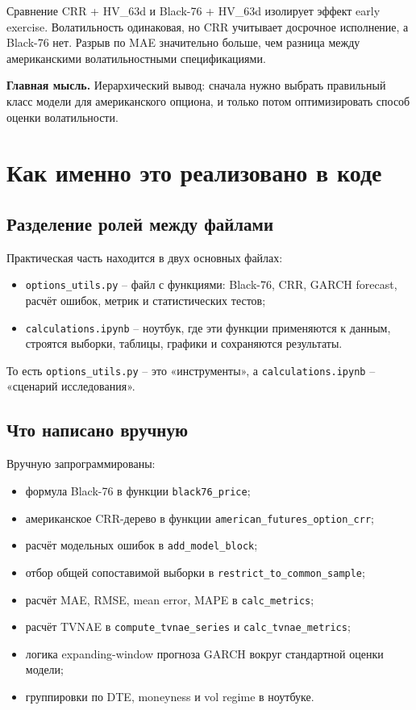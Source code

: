 \documentclass[11pt,a4paper]{article}
\newcommand{\key}[1]{%
  \vspace{0.15em}
  \noindent\colorbox{softblue}{%
    \parbox{\dimexpr\linewidth-2\fboxsep\relax}{\textbf{Главная мысль.} #1}%
  }\vspace{0.2em}
}
\begin{document}
Сравнение CRR + HV\_63d и Black-76 + HV\_63d изолирует эффект early exercise. Волатильность одинаковая, но CRR учитывает досрочное исполнение, а Black-76 нет. Разрыв по MAE значительно больше, чем разница между американскими волатильностными спецификациями.

\key{Иерархический вывод: сначала нужно выбрать правильный класс модели для американского опциона, и только потом оптимизировать способ оценки волатильности.}

\section{Как именно это реализовано в коде}

\subsection{Разделение ролей между файлами}

Практическая часть находится в двух основных файлах:

\begin{itemize}
    \item \texttt{options\_utils.py} -- файл с функциями: Black-76, CRR, GARCH forecast, расчёт ошибок, метрик и статистических тестов;
    \item \texttt{calculations.ipynb} -- ноутбук, где эти функции применяются к данным, строятся выборки, таблицы, графики и сохраняются результаты.
\end{itemize}

То есть \texttt{options\_utils.py} -- это «инструменты», а \texttt{calculations.ipynb} -- «сценарий исследования».

\subsection{Что написано вручную}

Вручную запрограммированы:

\begin{itemize}
    \item формула Black-76 в функции \texttt{black76\_price};
    \item американское CRR-дерево в функции \texttt{american\_futures\_option\_crr};
    \item расчёт модельных ошибок в \texttt{add\_model\_block};
    \item отбор общей сопоставимой выборки в \texttt{restrict\_to\_common\_sample};
    \item расчёт MAE, RMSE, mean error, MAPE в \texttt{calc\_metrics};
    \item расчёт TVNAE в \texttt{compute\_tvnae\_series} и \texttt{calc\_tvnae\_metrics};
    \item логика expanding-window прогноза GARCH вокруг стандартной оценки модели;
    \item группировки по DTE, moneyness и vol regime в ноутбуке.
\end{itemize}
\end{document}
